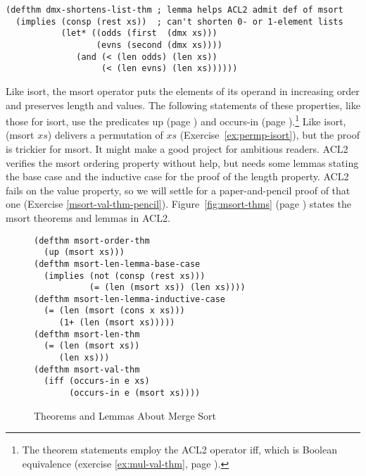\label{defthm:dmx-shortens-list}
\begin{Verbatim}
(defthm dmx-shortens-list-thm ; lemma helps ACL2 admit def of msort
  (implies (consp (rest xs))  ; can't shorten 0- or 1-element lists
           (let* ((odds (first  (dmx xs)))
                  (evns (second (dmx xs))))
              (and (< (len odds) (len xs))
                   (< (len evns) (len xs))))))
\end{Verbatim}

Like \textsf{isort}, the \textsf{msort} operator puts the elements of its operand
in increasing order and preserves length and values.
The following statements of these properties, like those for \textsf{isort},
use the predicates \textsf{up} (page \pageref{defun:up})
and \textsf{occurs-in} (page \pageref{def:occurs-in}).\footnote{The
theorem statements employ the ACL2 operator \textsf{iff}, which is
Boolean equivalence
(exercise \ref{ex:mul-val-thm}, page \pageref{def:equivalence-op}).}
Like \textsf{isort}, \textsf{(msort $xs$)} delivers a permutation of $xs$
(Exercise~\ref{ex:permp-isort}), but the proof is trickier for \textsf{msort}.
It might make a good project for ambitious readers.
ACL2 verifies the \textsf{msort} ordering property without help,
but needs some lemmas stating the base case and the inductive case for
the proof of the length property.
ACL2 fails on the value property, so
we will settle for a paper-and-pencil proof of that one
(Exercise \ref{msort-val-thm-pencil}).
Figure~\ref{fig:msort-thms} (page \pageref{fig:msort-thms})
states the \textsf{msort} theorems and lemmas in ACL2.

\begin{figure}
\begin{Verbatim}
(defthm msort-order-thm
  (up (msort xs)))
(defthm msort-len-lemma-base-case
  (implies (not (consp (rest xs)))
           (= (len (msort xs)) (len xs))))
(defthm msort-len-lemma-inductive-case
  (= (len (msort (cons x xs)))
     (1+ (len (msort xs)))))
(defthm msort-len-thm
  (= (len (msort xs))
     (len xs)))
(defthm msort-val-thm
  (iff (occurs-in e xs)
       (occurs-in e (msort xs))))
\end{Verbatim}
\label{defthm:msort-len}\label{defthm:msort-val}
\caption{Theorems and Lemmas About Merge Sort}
\label{fig:msort-thms}
\label{defthm:msort-ord}
\end{figure}

